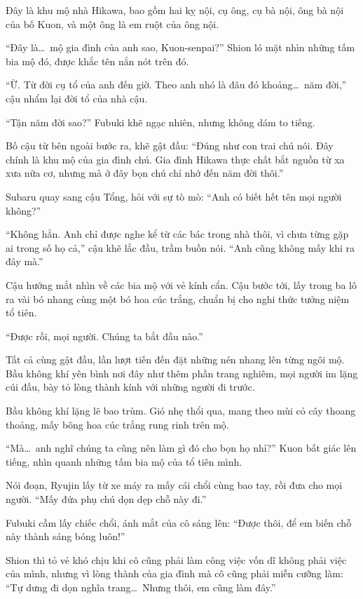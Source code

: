 \documentclass[../main.tex]{subfiles}
\begin{document}
Đây là khu mộ nhà Hikawa, bao gồm hai kỵ nội, cụ ông, cụ bà nội, ông bà nội của bố Kuon, và một ông là em ruột của ông nội.

``Đây là\dots\ mộ gia đình của anh sao, Kuon-senpai?'' Shion ló mặt nhìn những tấm bia mộ đó, được khắc tên nắn nót trên đó.

``Ừ. Từ đời cụ tổ của anh đến giờ. Theo anh nhó là đâu đó khoảng\dots\ năm đời,'' cậu nhẩm lại đời tổ của nhà cậu.

``Tận năm đời sao?'' Fubuki khẽ ngạc nhiên, nhưng không dám to tiếng.

Bố cậu từ bên ngoài bước ra, khẽ gật đầu: ``Đúng như con trai chú nói. Đây chính là khu mộ của gia đình chú. Gia đình Hikawa thực chất bắt nguồn từ xa xưa nữa cơ, nhưng mà ở đây bọn chú chỉ nhớ đến năm đời thôi.''

Subaru quay sang cậu Tổng, hỏi với sự tò mò: ``Anh có biết hết tên mọi người không?''

``Không hẳn. Anh chỉ được nghe kể từ các bác trong nhà thôi, vì chưa từng gặp ai trong số họ cả,'' cậu khẽ lắc đầu, trầm buồn nói. ``Anh cũng không mấy khi ra đây mà.''

Cậu hướng mắt nhìn về các bia mộ với vẻ kính cẩn. Cậu bước tới, lấy trong ba lô ra vài bó nhang cùng một bó hoa cúc trắng, chuẩn bị cho nghi thức tưởng niệm tổ tiên.

``Được rồi, mọi người. Chúng ta bắt đầu nào.''

Tất cả cùng gật đầu, lần lượt tiến đến đặt những nén nhang lên từng ngôi mộ. Bầu không khí yên bình nơi đây như thêm phần trang nghiêm, mọi người im lặng cúi đầu, bày tỏ lòng thành kính với những người đi trước.

Bầu không khí lặng lẽ bao trùm. Gió nhẹ thổi qua, mang theo mùi cỏ cây thoang thoảng, mấy bông hoa cúc trắng rung rinh trên mộ.

``Mà\dots\ anh nghĩ chúng ta cũng nên làm gì đó cho bọn họ nhỉ?'' Kuon bất giác lên tiếng, nhìn quanh những tấm bia mộ của tổ tiên mình.

Nói đoạn, Ryujin lấy từ xe máy ra mấy cái chổi cùng bao tay, rồi đưa cho mọi người. ``Mấy đứa phụ chú dọn dẹp chỗ này đi.''

Fubuki cầm lấy chiếc chổi, ánh mắt của cô sáng lên: ``Được thôi, để em biến chỗ này thành sáng bóng luôn!''

Shion thì tỏ vẻ khó chịu khi cô cũng phải làm công việc vốn dĩ không phải việc của mình, nhưng vì lòng thành của gia đình mà cô cũng phải miễn cưỡng làm: ``Tự dưng đi dọn nghĩa trang\dots\ Nhưng thôi, em cũng làm đây.''
\end{document}
